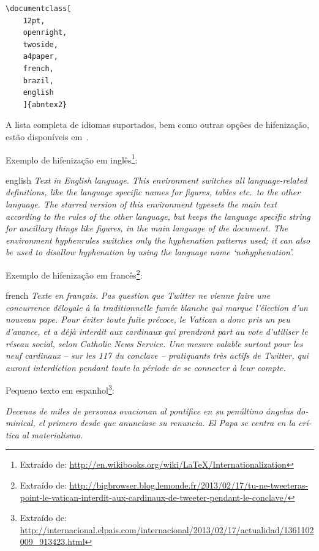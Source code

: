 \begin{verbatim}
\documentclass[
    12pt,
    openright,
    twoside,
    a4paper,
    french,
    brazil,
    english
    ]{abntex2}
\end{verbatim}

A lista completa de idiomas suportados, bem como outras opções de hifenização,
estão disponíveis em~.

Exemplo de hifenização em inglês\footnote{Extraído de:
	\url{http://en.wikibooks.org/wiki/LaTeX/Internationalization}}:

\begin{otherlanguage*}{english}
	\textit{Text in English language. This environment switches all language-related
		definitions, like the language specific names for figures, tables etc.\ to the other
		language. The starred version of this environment typesets the main text
		according to the rules of the other language, but keeps the language specific
		string for ancillary things like figures, in the main language of the document.
		The environment hyphenrules switches only the hyphenation patterns used; it can
		also be used to disallow hyphenation by using the language name
		`nohyphenation'.}
\end{otherlanguage*}

Exemplo de hifenização em francês\footnote{Extraído de:
	\url{http://bigbrowser.blog.lemonde.fr/2013/02/17/tu-ne-tweeteras-point-le-vatican-interdit-aux-cardinaux-de-tweeter-pendant-le-conclave/}}:

\begin{otherlanguage*}{french}
	\textit{Texte en français. Pas question que Twitter ne vienne faire une
		concurrence déloyale à la traditionnelle fumée blanche qui marque l'élection
		d'un nouveau pape. Pour éviter toute fuite précoce, le Vatican a donc pris un
		peu d'avance, et a déjà interdit aux cardinaux qui prendront part au vote
		d'utiliser le réseau social, selon Catholic News Service. Une mesure valable
		surtout pour les neuf cardinaux – sur les 117 du conclave – pratiquants très
		actifs de Twitter, qui auront interdiction pendant toute la période de se
		connecter à leur compte.}
\end{otherlanguage*}

Pequeno texto em espanhol\footnote{Extraído de:
	\url{http://internacional.elpais.com/internacional/2013/02/17/actualidad/1361102009_913423.html}}:

\foreignlanguage{spanish}{\textit{Decenas de miles de personas ovacionan al pontífice en su
		penúltimo ángelus dominical, el primero desde que anunciase su renuncia. El Papa se
		centra en la crítica al materialismo}}.

